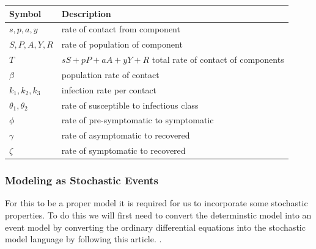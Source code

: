\documentclass{article}
\begin{document}
\begin{center}
  \begin{tabular}{|l|l|}
    \hline
    Symbol                 & Description                                                \\ [0.5ex]
    \hline\hline
    $s, p, a, y$           & rate of contact from component                             \\
    \hline
    $S, P, A, Y, R$        & rate of population of component                            \\
    \hline
    $T$                    & $sS+ pP + aA + yY + R$ total rate of contact of components \\
    \hline
    $\beta$                & population rate of contact                                 \\
    \hline
    $k_1, k_2, k_3$        & infection rate per contact                                 \\
    \hline
    $\theta _1 , \theta_2$ & rate of susceptible to infectious class                    \\
    \hline
    $\phi$                 & rate of pre-symptomatic to symptomatic                     \\
    \hline
    $\gamma$               & rate of asymptomatic to recovered                          \\
    \hline
    $\zeta$                & rate of symptomatic to recovered                           \\
    \hline
  \end{tabular}
\end{center}


\subsubsection{Modeling as Stochastic Events}
For this to be a proper model it is required for us to incorporate some stochastic properties. To do this we will first need to convert the determinstic model into an event model by converting the ordinary differential equations into the stochastic model language by following this article. \cite{events}.
\end{document}
